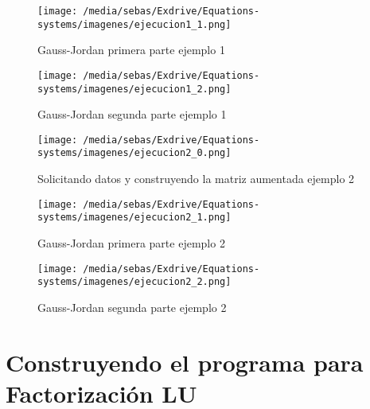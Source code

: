 \documentclass[letterpaper,12pt]{article}
\begin{document}
\begin{figure}[htbp]
    \centering
    \texttt{[image: /media/sebas/Exdrive/Equations-systems/imagenes/ejecucion1\_1.png]}
    \caption{Gauss-Jordan primera parte ejemplo 1}
    \label{fig: Gauss-Jordan primera parte ejemplo 1}
\end{figure}

\begin{figure}[htbp]
    \centering
    \texttt{[image: /media/sebas/Exdrive/Equations-systems/imagenes/ejecucion1\_2.png]}
    \caption{Gauss-Jordan segunda parte ejemplo 1}
    \label{fig: Gauss-Jordan segunda parte ejemplo 1}
\end{figure}

\begin{figure}[htbp]
    \centering
    \texttt{[image: /media/sebas/Exdrive/Equations-systems/imagenes/ejecucion2\_0.png]}
    \caption{Solicitando datos y construyendo la matriz aumentada ejemplo 2}
    \label{fig: Matriz aumentada ejemplo 2}
\end{figure}

\begin{figure}[htbp]
    \centering
    \texttt{[image: /media/sebas/Exdrive/Equations-systems/imagenes/ejecucion2\_1.png]}
    \caption{Gauss-Jordan primera parte ejemplo 2}
    \label{fig: Gauss-Jordan primera parte ejemplo 2}
\end{figure}

\begin{figure}[htbp]
    \centering
    \texttt{[image: /media/sebas/Exdrive/Equations-systems/imagenes/ejecucion2\_2.png]}
    \caption{Gauss-Jordan segunda parte ejemplo 2}
    \label{fig: Gauss-Jordan segunda parte ejemplo 2}
\end{figure}

\section*{Construyendo el programa para Factorización LU}
\end{document}

